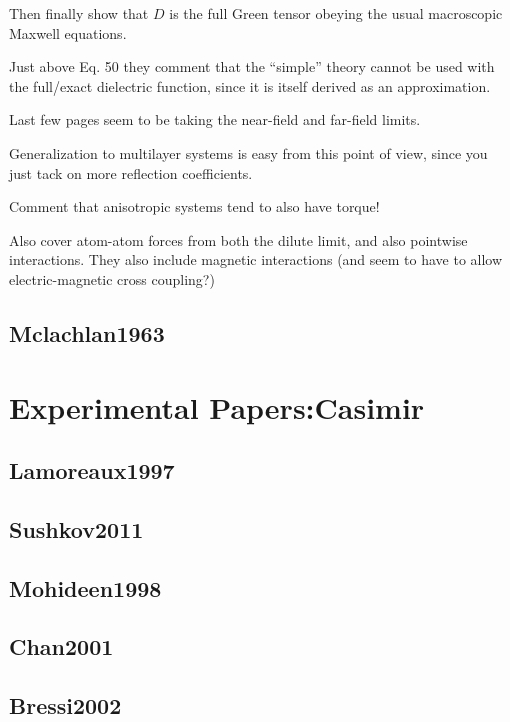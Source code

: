 Then finally show that $D$ is the full Green tensor obeying the usual macroscopic Maxwell equations.  

Just above Eq. 50 they comment that the ``simple'' theory cannot be used with the
 full/exact dielectric function, since it is itself derived as an approximation.  

Last few pages seem to be taking the near-field and far-field limits.  

Generalization to multilayer systems is easy from this point of view,
 since you just tack on more reflection coefficients.  

Comment that anisotropic systems tend to also have torque!

Also cover atom-atom forces from both the dilute limit, and also pointwise interactions.  
They also include magnetic interactions (and seem to have to allow electric-magnetic cross coupling?)

\subsection{Mclachlan1963}

\cite{Mclachlan1963}

\section{Experimental Papers:Casimir}

\subsection{Lamoreaux1997}

\cite{Lamoreaux1997}
\subsection{Sushkov2011}

\cite{Sushkov2011}
\subsection{Mohideen1998}
\cite{Mohideen1998} 

\subsection{Chan2001}

\cite{Chan2001}
\subsection{Bressi2002}

